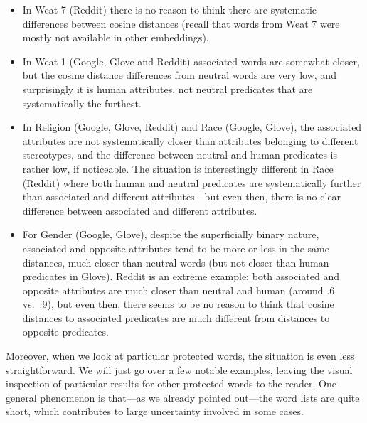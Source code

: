 \documentclass{clv3}
\begin{document}
\begin{itemize}
\item
  In Weat 7 (Reddit) there is no reason to think there are systematic
  differences between cosine distances (recall that words from Weat 7
  were mostly not available in other embeddings).
\item
  In Weat 1 (Google, Glove and Reddit) associated words are somewhat
  closer, but the cosine distance differences from neutral words are
  very low, and surprisingly it is human attributes, not neutral
  predicates that are systematically the furthest.
\item
  In Religion (Google, Glove, Reddit) and Race (Google, Glove), the
  associated attributes are not systematically closer than attributes
  belonging to different stereotypes, and the difference between neutral
  and human predicates is rather low, if noticeable. The situation is
  interestingly different in Race (Reddit) where both human and neutral
  predicates are systematically further than associated and different
  attributes---but even then, there is no clear difference between
  associated and different attributes.
\item
  For Gender (Google, Glove), despite the superficially binary nature,
  associated and opposite attributes tend to be more or less in the same
  distances, much closer than neutral words (but not closer than human
  predicates in Glove). Reddit is an extreme example: both associated
  and opposite attributes are much closer than neutral and human (around
  .6 vs.~.9), but even then, there seems to be no reason to think that
  cosine distances to associated predicates are much different from
  distances to opposite predicates.
\end{itemize}

Moreover, when we look at particular protected words, the situation is
even less straightforward. We will just go over a few notable examples,
leaving the visual inspection of particular results for other protected
words to the reader. One general phenomenon is that---as we already
pointed out---the word lists are quite short, which contributes to large
uncertainty involved in some cases.
\end{document}
